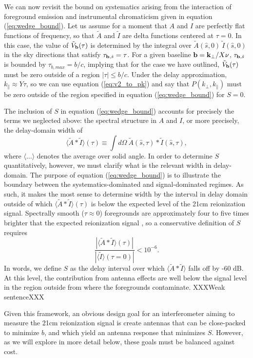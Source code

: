 \documentclass[11pt]{article}
\newcommand{\kvec}{{\bf k}}
\newcommand{\bvec}{{\bf b}}
\newcommand{\shat}{{\hat s}}
\newcommand{\kpr}{{k_\perp}}
\newcommand{\kvpr}{{\kvec_\perp}}
\newcommand{\kpl}{{k_\parallel}}
\newcommand{\AI}{{\langle\tilde A*\tilde I\rangle}}
\newcommand{\AItau}{{\AI(\tau)}}
\begin{document}
We can now revisit the bound on systematics arising from the interaction of foreground emission and
instrumental chromaticism given in equation (\ref{eq:wedge_bound}).  Let us assume for a moment that
$A$ and $I$ are perfectly flat functions of frequency, so that $\tilde A$ and $\tilde I$ are delta functions
centered at $\tau=0$.  In this case, the value of $\tilde V_\bvec(\tau)$ is determined by
the integral over $\tilde A(\shat,0)~\tilde I(\shat,0)$ in the sky directions that satisfy $\tau_{\bvec,\shat}=\tau$.
For a given baseline $\bvec=\kvpr/X\nu$, $\tau_{\bvec,\shat}$ is bounded by $\tau_{b,max}=b/c$, implying that
for the case we have outlined, $\tilde V_\bvec(\tau)$ must be zero outside of a region
$|\tau|\le b/c$.  Under the delay approximation, $\kpl\approx Y\tau$, so we can use equation
(\ref{eq:v2_to_pk}) and say that $P(\kpr,\kpl)$ must be zero outside of the region specified in 
equation (\ref{eq:wedge_bound}) for $S=0$.

The inclusion of $S$ in equation (\ref{eq:wedge_bound}) accounts for precisely the terms we neglected above:
the spectral structure in $A$ and $I$, or more precisely, the delay-domain width of 
\begin{equation}
\AItau\equiv\int{d\Omega~\tilde A(\shat,\tau)*\tilde I(\shat,\tau)},
\end{equation}
where $\langle\dots\rangle$ denotes the average over solid angle.
In order to determine $S$ quantitatively, however,
we must clarify what is the relevant width in delay-domain.  The purpose of equation (\ref{eq:wedge_bound}) is 
to illustrate
the boundary between the systematics-dominated and signal-dominated regimes.
As such, it makes the most sense to determine width by the interval in
delay domain outside of which $\AItau$ is below the expected level
of the 21cm reionization signal.  Spectrally smooth ($\tau\approx0$) foregrounds are approximately
four to five times brighter that the expected reionization signal \citep{unknown}, so a conservative definition of
$S$ requires
\begin{equation}
\frac{|\AItau|}{|\langle\tilde I\rangle(\tau=0)|}<10^{-6}.
\label{eq:def_S}
\end{equation}
In words, we define $S$ as the delay interval over which
$\AI$ falls off by -60 dB.  At this level, the contribution from antenna effects are well below the signal level in the region outside from where the foregrounds contaminate.  XXXWeak sentenceXXX

Given this framework, an obvious design goal for an interferometer aiming to 
measure the 21cm reionization signal is create antennas that can be close-packed to minimize $b$, and
which yield an antenna response that minimizes $S$.  However, as we will explore in more detail below, 
these goals must be balanced against cost.
\end{document}
